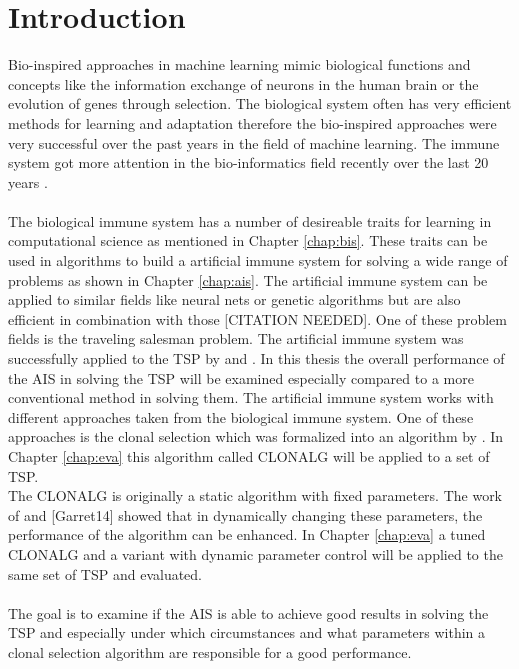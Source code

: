 %
%
% 
% 
% 


\chapter{Introduction}
\label{chap:intro}

Bio-inspired approaches in machine learning mimic biological functions and concepts like the information exchange of neurons in the human brain or the evolution of genes through selection. The biological system often has very efficient methods for learning and adaptation therefore the bio-inspired approaches were very successful over the past years in the field of machine learning. The immune system got more attention in the bio-informatics field recently over the last 20 years \cite{tan2016artificial}.\\\\
The biological immune system has a number of desireable traits for learning in computational science as mentioned in Chapter \ref{chap:bis}. These traits can be used in algorithms to build a artificial immune system for solving a wide range of problems as shown in Chapter \ref{chap:ais}. The artificial immune system can be applied to similar fields like neural nets or genetic algorithms but are also efficient in combination with those [CITATION NEEDED]. One of these problem fields is the traveling salesman problem. The artificial immune system was successfully applied to the TSP by \cite{DEC02} and \cite{sun}. In this thesis the overall performance of the AIS in solving the TSP will be examined especially compared to a more conventional method in solving them. The artificial immune system works with different approaches taken from the biological immune system. One of these approaches is the clonal selection which was formalized into an algorithm by \cite{DEC02}. In Chapter \ref{chap:eva} this algorithm called CLONALG will be applied to a set of TSP.\\
The CLONALG is originally a static algorithm with fixed parameters. The work of \cite{RIFF09} and [Garret14] showed that in dynamically changing these parameters, the performance of the algorithm can be enhanced. In Chapter \ref{chap:eva} a tuned CLONALG and a variant with dynamic parameter control will be applied to the same set of TSP and evaluated.\\\\
The goal is to examine if the AIS is able to achieve good results in solving the TSP and especially under which circumstances and what parameters within a clonal selection algorithm are responsible for a good performance.



